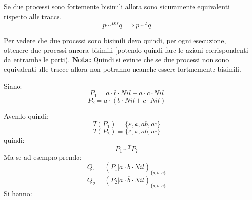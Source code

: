 \begin{definizione}
  Se due processi sono fortemente bisimili allora sono sicuramente equivalenti
  rispetto alle tracce. 
  \[p\sim^{Bis}q \implies p\sim^{T}q\]
\end{definizione}
Per vedere che due processi sono bisimili devo quindi, per ogni esecuzione,
ottenere due processi ancora bisimili (potendo quindi fare le azioni
corrispondenti da entrambe le parti). 
\textbf{Nota: } Quindi si evince che se due processi non sono equivalenti alle tracce allora non potranno neanche essere fortmemente bisimili.
\begin{esempio}
  Siano:
  \[P_1=a\cdot b\cdot Nil+a\cdot c\cdot Nil\]
  \[P_2=a\cdot(b\cdot Nil+c\cdot Nil)\]
  \begin{center}
  \end{center}
  \begin{center}
  \end{center}
  Avendo quindi:
  \[T(P_1)=\{\varepsilon, a, ab, ac\}\]
  \[T(P_2)=\{\varepsilon, a, ab, ac\}\]
  quindi:
  \[P_1\sim^T P_2\]
  Ma se ad esempio prendo:
  \[Q_1=(P_1|\overline{a}\cdot \overline{b}\cdot Nil )_{\{a, b, c\}}\]
  \[Q_2=(P_2|\overline{a}\cdot \overline{b}\cdot Nil )_{\{a, b, c\}}\]
  Si hanno:
   \begin{center}
\end{center}
\end{esempio}
